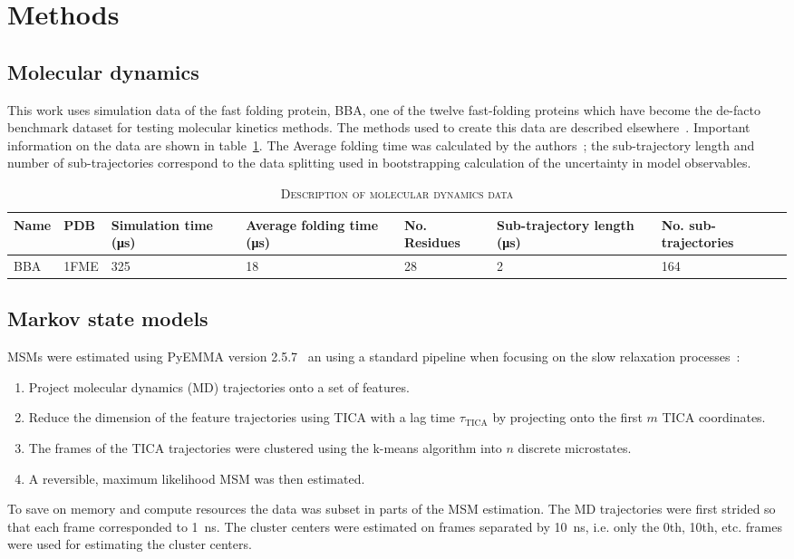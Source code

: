 \documentclass[journal=jacsat,manuscript=article]{achemso}
\begin{document}
\section{Methods}
\subsection{Molecular dynamics}

This work uses simulation data of the fast folding protein, BBA, one of the twelve fast-folding proteins which have become the de-facto benchmark dataset for testing molecular kinetics methods. The methods used to create this data are described elsewhere~\cite{lindorff-larsen_how_2011}. Important information on the data are shown in table~\ref{tab:data_description}. The Average folding time was calculated by the authors~\cite{lindorff-larsen_how_2011}; the sub-trajectory length and number of sub-trajectories correspond to the data splitting used in bootstrapping calculation of the uncertainty in model observables.

\begin{table}
    \caption{\textsc{Description of molecular dynamics data}}
    \begin{tabularx}{\textwidth}{llXXXXX}
    \toprule
    Name & PDB & Simulation time (\si{\micro\second}) & Average folding time (\si{\micro\second}) & No. Residues & Sub-trajectory length (\si{\micro\second}) & No. sub-trajectories \\
    \midrule
    BBA                 & 1FME      & \num{325}     & \num{18}  & 28 & \num{2} & 164 \\
    \bottomrule
    \end{tabularx}
    \label{tab:data_description}
\end{table}

\subsection{Markov state models}
MSMs were estimated using PyEMMA version 2.5.7~\cite{schererPyEMMASoftwarePackage2015a} an using a standard pipeline when focusing on the slow relaxation processes~\cite{noe_markov_2019, husic_markov_2018}: 
\begin{enumerate}
    \item Project molecular dynamics (MD) trajectories onto a set of features. 
    \item Reduce the dimension of the feature trajectories using TICA with a lag time $\tau_{\mathrm{TICA}}$ by projecting onto the first $m$ TICA coordinates. 
    \item The frames of the TICA trajectories were clustered using the k-means algorithm into $n$ discrete microstates. 
    \item A reversible, maximum likelihood MSM was then estimated. 
\end{enumerate}
To save on memory and compute resources  the data was subset in parts of the MSM estimation. The MD trajectories were first strided so that each frame corresponded to \SI{1}{\nano\second}. The cluster centers were estimated on frames separated by \SI{10}{\nano\second}, i.e. only the 0th, 10th, etc. frames were used for estimating the cluster centers. 
\end{document}
